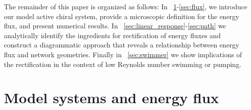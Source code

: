 \documentclass[
 preprint,
 preprintnumbers,
 amsmath,amssymb,
 aps,
 pre,
 longbibliography,
 superscriptaddress,
 10pt, twocolumn
]{revtex4-1}
\begin{document}




The remainder of this paper is organized as follows:
In \secname~\ref{sec:model}-\ref{sec:flux}, we introduce our model active chiral system, provide a microscopic definition for the energy flux, and present numerical results.
In \secname~\ref{sec:linear_response}-\ref{sec:path} we analytically identify the ingredients for rectification of energy fluxes and construct a diagrammatic approach that reveals a relationship between energy flux and network geometries.
Finally in \secname~\ref{sec:swimmer} we show implications of the rectification in the context of low Reynolds number swimming or pumping.

\section{Model systems and energy flux} \label{sec:model}
\end{document}
